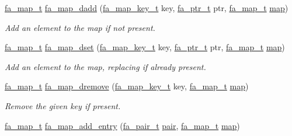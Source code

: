 \begin{DoxyCompactItemize}
\hyperlink{group___fa_map_gadcbb0c425af31be6aeb265159b2a7db0}{fa\-\_\-map\-\_\-t} \hyperlink{group___fa_map_ga2597c509111f8e9d4231afda12a162bf}{fa\-\_\-map\-\_\-dadd} (\hyperlink{group___fa_map_ga01c714699c14e805664c65b6a0ea974d}{fa\-\_\-map\-\_\-key\-\_\-t} key, \hyperlink{group___fa_ga915ddeae99ad7568b273d2b876425197}{fa\-\_\-ptr\-\_\-t} ptr, \hyperlink{group___fa_map_gadcbb0c425af31be6aeb265159b2a7db0}{fa\-\_\-map\-\_\-t} \hyperlink{literals_8h_a44305f0bc81207be0dcc90650733e331}{map})
\begin{DoxyCompactList}\small\item\em Add an element to the map if not present. \end{DoxyCompactList}\item 
\hyperlink{group___fa_map_gadcbb0c425af31be6aeb265159b2a7db0}{fa\-\_\-map\-\_\-t} \hyperlink{group___fa_map_gab8babfab6a71dc62465932708705c604}{fa\-\_\-map\-\_\-dset} (\hyperlink{group___fa_map_ga01c714699c14e805664c65b6a0ea974d}{fa\-\_\-map\-\_\-key\-\_\-t} key, \hyperlink{group___fa_ga915ddeae99ad7568b273d2b876425197}{fa\-\_\-ptr\-\_\-t} ptr, \hyperlink{group___fa_map_gadcbb0c425af31be6aeb265159b2a7db0}{fa\-\_\-map\-\_\-t} \hyperlink{literals_8h_a44305f0bc81207be0dcc90650733e331}{map})
\begin{DoxyCompactList}\small\item\em Add an element to the map, replacing if already present. \end{DoxyCompactList}\item 
\hyperlink{group___fa_map_gadcbb0c425af31be6aeb265159b2a7db0}{fa\-\_\-map\-\_\-t} \hyperlink{group___fa_map_ga9dab19db8db2ae0912dca03bb326fd9f}{fa\-\_\-map\-\_\-dremove} (\hyperlink{group___fa_map_ga01c714699c14e805664c65b6a0ea974d}{fa\-\_\-map\-\_\-key\-\_\-t} key, \hyperlink{group___fa_map_gadcbb0c425af31be6aeb265159b2a7db0}{fa\-\_\-map\-\_\-t} \hyperlink{literals_8h_a44305f0bc81207be0dcc90650733e331}{map})
\begin{DoxyCompactList}\small\item\em Remove the given key if present. \end{DoxyCompactList}\item 
\hyperlink{group___fa_map_gadcbb0c425af31be6aeb265159b2a7db0}{fa\-\_\-map\-\_\-t} \hyperlink{group___fa_map_ga8b23fc1bb5a9803e477f8075ec9f04b6}{fa\-\_\-map\-\_\-add\-\_\-entry} (\hyperlink{group___fa_pair_gac2b2e58c230bac4f8a63ef6c05072680}{fa\-\_\-pair\-\_\-t} \hyperlink{util_8h_a40ed40659d2ed7f8712b0fe6ba6edebe}{pair}, \hyperlink{group___fa_map_gadcbb0c425af31be6aeb265159b2a7db0}{fa\-\_\-map\-\_\-t} \hyperlink{literals_8h_a44305f0bc81207be0dcc90650733e331}{map})

\end{DoxyCompactItemize}
